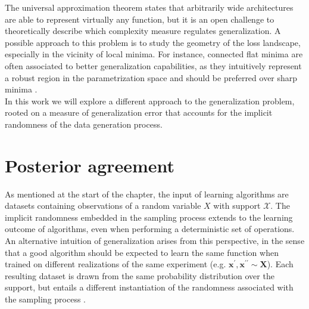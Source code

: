 


The universal approximation theorem states that arbitrarily wide architectures
are able to represent virtually any function, but it is an open challenge to theoretically describe which
complexity measure regulates generalization. A possible approach to this problem is to
study the geometry of the loss landscape, especially in the vicinity of local minima. For instance, 
connected flat minima are often associated to better generalization capabilities, as they
intuitively represent a robust region in the parametrization space and should be 
preferred over sharp minima
\cite{jimenezInductiveBiasDeep}. \\

In this work we will explore a different approach to the generalization problem, rooted on
a measure of generalization error that accounts for the implicit randomness of the data
generation process.

\section{Posterior agreement}

As mentioned at the start of the chapter, the input of learning algorithms are
datasets containing observations of a random variable $X$ with support $\mathcal{X}$. The implicit randomness embedded 
in the sampling process extends to the learning outcome of algorithms,
even when performing a deterministic set of operations. 
An alternative intuition of generalization arises from this perspective, in the sense 
that a good algorithm should be expected to learn the same function when trained on 
different realizations of the same experiment (e.g. $\bm{x^\prime}, \bm{x^{\prime\prime}} \sim \bm{X}$). Each
resulting dataset is drawn from the same probability distribution over the support, 
but entails a different instantiation of the randomness associated with the 
sampling process \cite{buhmannDataScienceAlgorithms2022}. \\

